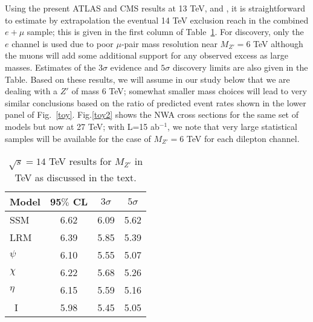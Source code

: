 \documentclass[14pt]{article}
\begin{document}
Using the present ATLAS and CMS results at 13 TeV, \cite{Aaboud:2017buh} and \cite{Sirunyan:2018exx}, it is straightforward to estimate by extrapolation the eventual 14 TeV 
exclusion reach in the combined $e+\mu$ sample; this is given in the first column of Table~\ref{spec}. For discovery, only the $e$ channel is used due to poor $\mu$-pair mass 
resolution near $M_{Z'}=6$ TeV although the muons will add some additional support for any observed excess as large masses. Estimates of the $3\sigma$ evidence and $5\sigma$ 
discovery limits are also given in the Table. Based on these results, we will assume in our study below that we are dealing with a $Z'$ of mass 6 TeV; somewhat smaller mass 
choices will lead to very similar conclusions based on the ratio of predicted event rates shown in the lower panel of Fig.~\ref{toy}.  Fig.\ref{toy2} shows the NWA cross 
sections for the same set of models but now at 27 TeV; with L=15 ab$^{-1}$, we note that very large statistical samples will be available for the case of $M_{Z'}=6$ TeV 
for each dilepton channel. 


%
%


%
\begin{table}
\centering
\begin{tabular}{|l|c|c|c|} \hline\hline
  Model &   95$\%$ CL     &  $3\sigma$     &   $5\sigma$   \\
\hline
SSM    &     6.62     &  6.09        &  5.62     \\
LRM    &   6.39     & 5.85        & 5.39  \\
$\psi$    &  6.10   & 5.55   & 5.07  \\
$\chi$   &  6.22    & 5.68    & 5.26   \\
$\eta$   &  6.15     &  5.59  &  5.16   \\
~I        & 5.98   &  5.45   &  5.05  \\
\hline\hline
\end{tabular}
\caption{ $\sqrt s=14$ TeV results for $M_{Z'}$ in TeV as discussed in the text. }
\label{spec}
\end{table}
%
\end{document}
